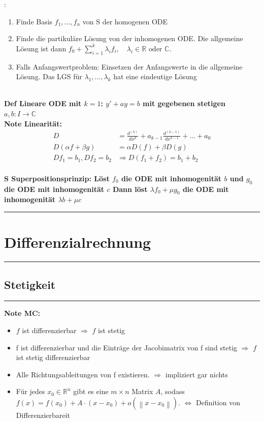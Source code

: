 \documentclass[7pt,landscape, margin = 0.1mm]{article}
\newcommand{\titellinie}{\rule{1.\linewidth}{0.75pt}}
\newcommand*{\mysection}[2][black]{\vskip 0pt \titellinie\vspace{-20pt}\section{#2}\vspace{-14pt}\titellinie \colorlet{chaptercolor}{#1}}
\newcommand*{\mysubsection}[1]{\vspace{-2mm}\color{chaptercolor}\subsection{ #1 }
\vspace{-1mm}\hrule\vspace{1.5mm}\color{black}
\vspace{2mm}}
\newcommand{\KRZ}[2]{\vspace{1mm} \hline \vspace{1mm} \color{chaptercolor}{RC #1}:\color{black} \   \hspace{0.2cm}\vspace{1mm}   {\begin{minipage}{20em}
#2 \end{minipage}} \vspace{1mm}  \hline \vspace{1mm}  \\}
\newcommand{\DEF}[2]{\color{chaptercolor}\bf{Def #1}:\color{black}    \hspace{0.2cm} #2 \\}
\newcommand{\NOTE}[2]{\color{chaptercolor}\bf{Note #1}:\color{black}    \hspace{0.2cm} #2 \\}
\newcommand{\SA}[2]{\color{chaptercolor}\bf{S #1}:\color{black}    \hspace{0.2cm} #2 \\}
\begin{document}
\begin{multicols}{4}
\begin{flushleft}
{\begin{itemize}
\end{itemize}}

\KRZ{Lineare ODE}{

\begin{enumerate}

\item Finde Basis $f_{1}, \ldots , f_{n}$ von S der homogenen ODE
\item Finde die partikuläre Lösung von der inhomogenen ODE. Die allgemeine Lösung ist dann $f_0+\sum_{i=1}^k \lambda_i f_i, \quad \lambda_i \in \mathbb{R} \text { oder } \mathbb{C} \text {. }$
\item Falls Anfangswertproblem: Einsetzen der Anfangswerte in die allgemeine Lösung. Das LGS für $\lambda_{1},\ldots, \lambda_{k}$ hat eine eindeutige Lösung
 
\end{enumerate}
}
\DEF{Lineare ODE mit $k=1$}{$y' +ay=b$ mit gegebenen stetigen $a,b:I\to\mathbb{C}$}

\NOTE{Linearität}{  \begin{align*}
    D                      & = \frac{d^{(k)}}{dx^k} + a_{k-1} \frac{d^{(k-1)}}{dx^{k-1}} + \dots + a_0 \\
    D(\alpha f + \beta g)  & = \alpha D(f) + \beta D(g)                                                \\
    Df_1 = b_1, Df_2 = b_2 & \Rightarrow D(f_1 + f_2) = b_1 + b_2
  \end{align*}}
  
  
\SA{Superpositionsprinzip}{
Löst $f_{0}$ die ODE mit inhomogenität $b$ und
$g_{0}$ die ODE mit inhomogenität $c$ 
Dann löst $\lambda f_{0}+ \mu g_{0}$ die ODE mit inhomogenität $\lambda b + \mu c$}

\mysection[blue]{\centering Differenzialrechnung}
\mysubsection{Stetigkeit}
\NOTE{MC}{
\begin{itemize}
\item $f$ ist differenzierbar $\Rightarrow$ $f$ ist stetig
\item  f ist differenzierbar und die Einträge der Jacobimatrix von f sind stetig $\Rightarrow$ $f$ ist stetig differenzierbar
\item  Alle Richtungsableitungen von f existieren. $\Rightarrow$ impliziert gar nichts
\item Für jedes $x_0 \in \mathbb{R}^n$ gibt es eine $m \times n$ Matrix $A$, sodass $f(x)=f\left(x_0\right)+A \cdot\left(x-x_0\right)+o\left(\left\|x-x_0\right\|\right)$. $\Leftrightarrow$   Definition von Differenzierbareit
\end{itemize}

}
\end{flushleft}
\end{multicols}
\end{document}
